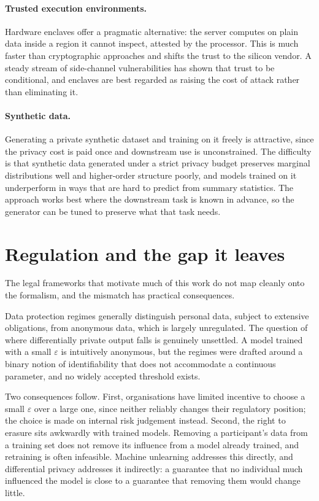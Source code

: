 \documentclass[11pt,a4paper]{article}
\begin{document}
\paragraph{Trusted execution environments.}
Hardware enclaves offer a pragmatic alternative: the server computes on plain
data inside a region it cannot inspect, attested by the processor. This is
much faster than cryptographic approaches and shifts the trust to the silicon
vendor. A steady stream of side-channel vulnerabilities has shown that trust
to be conditional, and enclaves are best regarded as raising the cost of
attack rather than eliminating it.

\paragraph{Synthetic data.}
Generating a private synthetic dataset and training on it freely is
attractive, since the privacy cost is paid once and downstream use is
unconstrained. The difficulty is that synthetic data generated under a strict
privacy budget preserves marginal distributions well and higher-order
structure poorly, and models trained on it underperform in ways that are hard
to predict from summary statistics. The approach works best where the
downstream task is known in advance, so the generator can be tuned to preserve
what that task needs.

\section{Regulation and the gap it leaves}
\label{sec:regulation}

The legal frameworks that motivate much of this work do not map cleanly onto
the formalism, and the mismatch has practical consequences.

Data protection regimes generally distinguish personal data, subject to
extensive obligations, from anonymous data, which is largely unregulated. The
question of where differentially private output falls is genuinely unsettled.
A model trained with a small $\varepsilon$ is intuitively anonymous, but the
regimes were drafted around a binary notion of identifiability that does not
accommodate a continuous parameter, and no widely accepted threshold exists.

Two consequences follow. First, organisations have limited incentive to choose
a small $\varepsilon$ over a large one, since neither reliably changes their
regulatory position; the choice is made on internal risk judgement instead.
Second, the right to erasure sits awkwardly with trained models. Removing a
participant's data from a training set does not remove its influence from a
model already trained, and retraining is often infeasible. Machine unlearning
addresses this directly, and differential privacy addresses it indirectly:
a guarantee that no individual much influenced the model is close to a
guarantee that removing them would change little.
\end{document}
